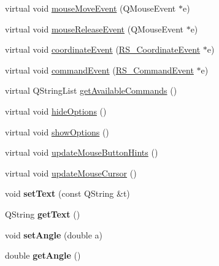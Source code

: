 \begin{DoxyCompactItemize}
\item 
virtual void \hyperlink{classRS__ActionDrawText_aa1f8f530d08ce1a9d20251b417b3868a}{mouse\-Move\-Event} (Q\-Mouse\-Event $\ast$e)
\item 
virtual void \hyperlink{classRS__ActionDrawText_aca35ece2964a34e948ff2146ac1a9d40}{mouse\-Release\-Event} (Q\-Mouse\-Event $\ast$e)
\item 
virtual void \hyperlink{classRS__ActionDrawText_ae9bdc5193b8a2ef0b96510cb35cb23bd}{coordinate\-Event} (\hyperlink{classRS__CoordinateEvent}{R\-S\-\_\-\-Coordinate\-Event} $\ast$e)
\item 
virtual void \hyperlink{classRS__ActionDrawText_a5ba75930214f7f21e95b01a34df4bc99}{command\-Event} (\hyperlink{classRS__CommandEvent}{R\-S\-\_\-\-Command\-Event} $\ast$e)
\item 
virtual Q\-String\-List \hyperlink{classRS__ActionDrawText_a8f4815267decd4b77feded576e6497db}{get\-Available\-Commands} ()
\item 
virtual void \hyperlink{classRS__ActionDrawText_a480142e9a2d1b6ff04e2f7f1f47b9076}{hide\-Options} ()
\item 
virtual void \hyperlink{classRS__ActionDrawText_a6c66cbf305d037fd50e410c8f3d49b79}{show\-Options} ()
\item 
virtual void \hyperlink{classRS__ActionDrawText_ae51a0b5509cd4869c7b1f9ec3cde34a9}{update\-Mouse\-Button\-Hints} ()
\item 
virtual void \hyperlink{classRS__ActionDrawText_a42f602f8473dd04d302020ff849c368a}{update\-Mouse\-Cursor} ()
\item 
\hypertarget{classRS__ActionDrawText_a99af786ac8b6944580de825709ca9460}{void {\bfseries set\-Text} (const Q\-String \&t)}\label{classRS__ActionDrawText_a99af786ac8b6944580de825709ca9460}

\item 
\hypertarget{classRS__ActionDrawText_a476fe46210e2f337a6cd4dd5904208d9}{Q\-String {\bfseries get\-Text} ()}\label{classRS__ActionDrawText_a476fe46210e2f337a6cd4dd5904208d9}

\item 
\hypertarget{classRS__ActionDrawText_a5633853f6d717c150c4bc26540fa5c46}{void {\bfseries set\-Angle} (double a)}\label{classRS__ActionDrawText_a5633853f6d717c150c4bc26540fa5c46}

\item 
\hypertarget{classRS__ActionDrawText_a5b9898379dec8ce977cfb8e9f6ba4da9}{double {\bfseries get\-Angle} ()}\label{classRS__ActionDrawText_a5b9898379dec8ce977cfb8e9f6ba4da9}

\end{DoxyCompactItemize}
